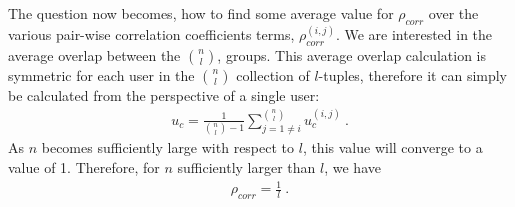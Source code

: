 The question now becomes, how to find some average value for $\rho_{corr}$ over the various pair-wise correlation coefficients terms, $\rho_{corr}^{(i,j)}$. We are interested in the average overlap between the $\binom{n}{l}$, groups. This average overlap calculation is symmetric for each user in the $\binom{n}{l}$ collection of $l$-tuples, therefore it can simply be calculated from the perspective of a single user:
\begin{equation}\label{eq:avg_corr}
    \begin{aligned}
        u_c = \frac{1}{\binom{n}{l}-1}\sum_{j=1\neq i}^{\binom{n}{l}}u_c^{(i,j)} \ .
    \end{aligned}
\end{equation}
As $n$ becomes sufficiently large with respect to $l$, this value will converge to a value of 1. Therefore, for $n$ sufficiently larger than $l$, we have
\begin{equation}\label{eq:const_corr}
    \begin{aligned}
        \rho_{corr} = \frac{1}{l} \ .
    \end{aligned}
\end{equation}